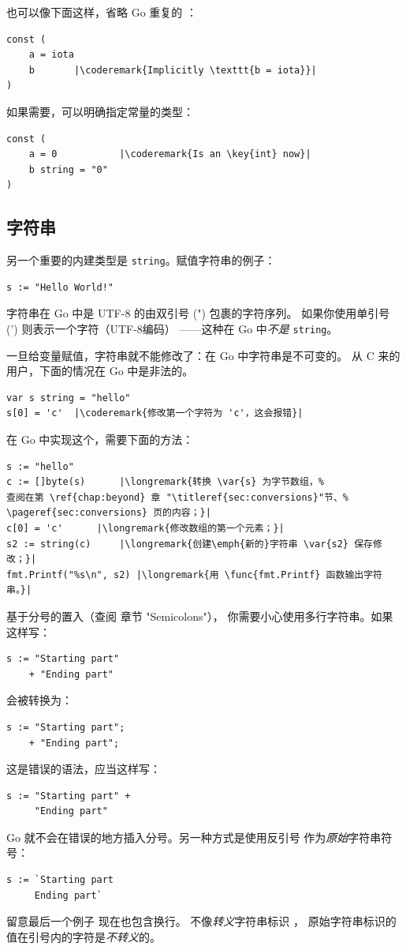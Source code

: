也可以像下面这样，省略 Go 重复的 ：
\begin{lstlisting}
const (
	a = iota
	b	    |\coderemark{Implicitly \texttt{b = iota}}|
)
\end{lstlisting}
如果需要，可以明确指定常量的类型：
\begin{lstlisting}
const (
	a = 0           |\coderemark{Is an \key{int} now}|
	b string = "0" 
)
\end{lstlisting}

\subsection{字符串}
另一个重要的内建类型是 \lstinline{string}。赋值字符串的例子：
\begin{lstlisting}
s := "Hello World!"
\end{lstlisting}
字符串在 Go 中是 UTF-8 的由双引号 (") 包裹的字符序列。
如果你使用单引号 (') 则表示一个字符（UTF-8编码）
——这种在 Go 中\emph{不是} \lstinline{string}。

一旦给变量赋值，字符串就不能修改了：在 Go 中字符串是不可变的。
从 C 来的用户，下面的情况在 Go 中是非法的。
\begin{lstlisting}
var s string = "hello"
s[0] = 'c'  |\coderemark{修改第一个字符为 'c'，这会报错}|
\end{lstlisting}
在 Go 中实现这个，需要下面的方法：
\begin{lstlisting}
s := "hello"
c := []byte(s)	    |\longremark{转换 \var{s} 为字节数组，%
查阅在第 \ref{chap:beyond} 章 "\titleref{sec:conversions}"节、%
\pageref{sec:conversions} 页的内容；}|
c[0] = 'c'	    |\longremark{修改数组的第一个元素；}|
s2 := string(c)     |\longremark{创建\emph{新的}字符串 \var{s2} 保存修改；}|
fmt.Printf("%s\n", s2) |\longremark{用 \func{fmt.Printf} 函数输出字符串。}|
\end{lstlisting}
\showremarks

\begin{lbar}[多行字符串]
基于分号的置入（查阅 \cite{effective_go} 章节 "Semicolons"），
你需要小心使用多行字符串。如果这样写：
\begin{lstlisting}
s := "Starting part"
    + "Ending part"
\end{lstlisting}
会被转换为：
\begin{lstlisting}
s := "Starting part";
    + "Ending part";
\end{lstlisting}
这是错误的语法，应当这样写：
\begin{lstlisting}
s := "Starting part" +
     "Ending part"
\end{lstlisting}
Go 就不会在错误的地方插入分号。另一种方式是使用反引号  作为\emph{原始}字符串符号：
\begin{lstlisting}
s := `Starting part
     Ending part`
\end{lstlisting}
留意最后一个例子  现在也包含换行。
不像\emph{转义}字符串标识  ，
原始字符串标识的值在引号内的字符是\emph{不转义}的。
\end{lbar}
